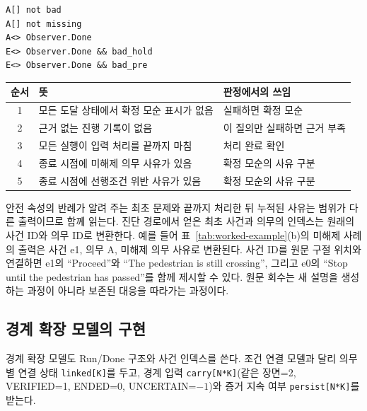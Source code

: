 \begin{revision}
\noindent\begin{minipage}{\columnwidth}
\begin{lstlisting}[caption={조건 연결 모델의 실제 질의(queries.q).},label={lst:queries}]
A[] not bad
A[] not missing
A<> Observer.Done
E<> Observer.Done && bad_hold
E<> Observer.Done && bad_pre
\end{lstlisting}
\end{minipage}

\begin{table}[t]
\centering
\color{revisionblue}
\label{tab:query-meaning}
\footnotesize
\begin{tabularx}{\columnwidth}{cYY}
\toprule
순서 & 뜻 & 판정에서의 쓰임 \\
 & 모든 도달 상태에서 확정 모순 표시가 없음 & 실패하면 확정 모순 \\
2 & 근거 없는 진행 기록이 없음 & 이 질의만 실패하면 근거 부족 \\
3 & 모든 실행이 입력 처리를 끝까지 마침 & 처리 완료 확인 \\
4 & 종료 시점에 미해제 의무 사유가 있음 & 확정 모순의 사유 구분 \\
5 & 종료 시점에 선행조건 위반 사유가 있음 & 확정 모순의 사유 구분 \\
\bottomrule
\end{tabularx}
\end{table}

안전 속성의 반례가 알려 주는 최초 문제와 끝까지 처리한 뒤 누적된 사유는 범위가 다른 출력이므로 함께 읽는다. 진단 경로에서 얻은 최초 사건과 의무의 인덱스는 원래의 사건 ID와 의무 ID로 변환한다. 예를 들어 표~\ref{tab:worked-example}(b)의 미해제 사례의 출력은 사건 e1, 의무 A, 미해제 의무 사유로 변환된다. 사건 ID를 원문 구절 위치와 연결하면 e1의 ``Proceed''와 ``The pedestrian is still crossing'', 그리고 e0의 ``Stop until the pedestrian has passed''를 함께 제시할 수 있다. 원문 회수는 새 설명을 생성하는 과정이 아니라 보존된 대응을 따라가는 과정이다.

\subsection{경계 확장 모델의 구현}
\label{sec:boundary-implementation}
경계 확장 모델도 Run/Done 구조와 사건 인덱스를 쓴다. 조건 연결 모델과 달리 의무별 연결 상태 \texttt{linked[K]}를 두고, 경계 입력 \texttt{carry[N*K]}(같은 장면=2, VERIFIED=1, ENDED=0, UNCERTAIN=$-1$)와 증거 지속 여부 \texttt{persist[N*K]}를 받는다.


\end{revision}
